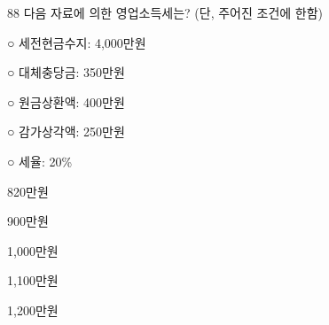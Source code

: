 \begin{question}{88}
다음 자료에 의한 영업소득세는? (단, 주어진 조건에 한함)
\begin{framedtext}
○ 세전현금수지: 4,000만원 \par
○ 대체충당금: 350만원 \par
○ 원금상환액: 400만원 \par
○ 감가상각액: 250만원 \par
○ 세율: 20\%
\end{framedtext}
\begin{choices}
  \item 820만원
  \item 900만원
  \item 1,000만원
  \item 1,100만원
  \item 1,200만원
\end{choices}
\end{question}
